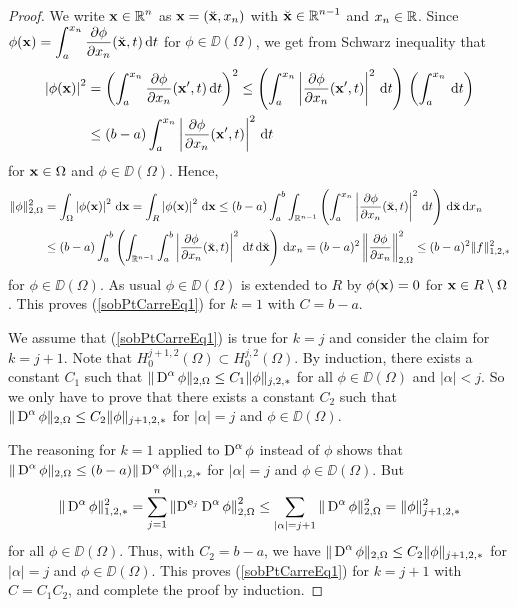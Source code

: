 \begin{proof}
We write $\displaystyle \mathbf{x}\in \mathbb{R}^n$ as
$\mathbf{x} = (\breve{\mathbf{x}}, x_n)$ with
$\displaystyle \breve{\mathbf{x}} \in \mathbb{R}^{n-1}$ and $x_n \in \mathbb{R}$.  Since
$\displaystyle \phi(\mathbf{x})
= \int_a^{x_n} \frac{\partial{\phi}}{\partial x_n}(\breve{\mathbf{x}}, t) \,\mathrm{d}{t}$
for $\phi \in \DD(\Omega)$, we get from Schwarz inequality that
\begin{align*}
\left|\phi(\mathbf{x})\right|^2 &= \left( \int_a^{x_n}
\frac{\partial{\phi}}{\partial x_n} (\mathbf{x}',t) \,\mathrm{d}{t} \right)^2 
\leq \left(\int_a^{x_n}
\left| \frac{\partial{\phi}}{\partial x_n} (\mathbf{x}',t)\right|^2 \,\mathrm{d}{t}\right)\,
\left( \int_a^{x_n} \,\mathrm{d}{t}\right) \\
&\leq (b-a) \int_a^{x_n} \left| \frac{\partial{\phi}}{\partial x_n} (\mathbf{x}',t)\right|^2 \,\mathrm{d}{t}
\end{align*}
for $\mathbf{x} \in \Omega$ and $\phi \in \DD(\Omega)$.  Hence,
\begin{align*}
\|\phi\|_{2,\Omega}^2 &= \int_\Omega \left|\phi(\mathbf{x})\right|^2\,\mathrm{d}{\mathbf{x}} 
= \int_R \left|\phi(\mathbf{x})\right|^2\,\mathrm{d}{\mathbf{x}}
\leq (b-a) \int_a^b \int_{\mathbb{R}^{n-1}} \left(
\int_a^{x_n} \left| \frac{\partial{\phi}}{\partial x_n} (\breve{\mathbf{x}},t)\right|^2 \,\mathrm{d}{t}\right)
\,\mathrm{d}{\breve{\mathbf{x}}} \,\mathrm{d}{x_n} \\
& \leq (b-a) \int_a^b \left( \int_{\mathbb{R}^{n-1}}
\int_a^b \left| \frac{\partial{\phi}}{\partial x_n} (\breve{\mathbf{x}},t)\right|^2 \,\mathrm{d}{t}
\,\mathrm{d}{\breve{\mathbf{x}}} \right) \,\mathrm{d}{x_n}
= (b-a)^2 \left\| \frac{\partial{\phi}}{\partial x_n} \right\|_{2,\Omega}^2 \leq (b-a)^2
\| f \|_{1,2,\ast}^2
\end{align*}
for $\phi \in \DD(\Omega)$.  As usual $\phi \in \DD(\Omega)$ is
extended to $R$ by $\phi(\mathbf{x}) = 0$ for $\mathbf{x} \in R \setminus \Omega$.
This proves (\ref{sobPtCarreEq1}) for $k=1$ with $C=b-a$.

We assume that (\ref{sobPtCarreEq1}) is true for $k=j$ and consider the claim
for $k=j+1$.  Note that
$\displaystyle H^{j+1,2}_0(\Omega) \subset H^{j,2}_0(\Omega)$.
By induction, there exists a constant $C_1$ such that
$\displaystyle \| \operatorname{D}^\alpha \phi \|_{2,\Omega}
\leq C_1 \|\phi\|_{j,2,\ast}$ for 
all $\phi \in \DD(\Omega)$ and $|\alpha| < j$.  So we only have to prove that
there exists a constant $C_2$ such that
$\displaystyle \| \operatorname{D}^\alpha \phi \|_{2,\Omega}
\leq C_2 \|\phi\|_{j+1,2,\ast}$ for
$|\alpha|=j$ and $\phi \in \DD(\Omega)$.

The reasoning for $k=1$ applied to $\displaystyle \operatorname{D}^\alpha \phi$
instead of $\phi$ shows
that $\displaystyle \|\operatorname{D}^\alpha \phi\|_{2,\Omega} \leq
(b-a) \| \operatorname{D}^\alpha \phi \|_{1,2,\ast}$
for $|\alpha|=j$ and $\phi \in \DD(\Omega)$.  But
\[
\| \operatorname{D}^\alpha \phi \|_{1,2,\ast}^2 = 
\sum_{j=1}^n \left\| \operatorname{D}^{\mathbf{e}_j} \operatorname{D}^\alpha \phi \right\|_{2,\Omega}^2 \leq
\sum_{|\alpha|=j+1} \| \operatorname{D}^\alpha \phi \|_{2,\Omega}^2 = \|\phi\|_{j+1,2,\ast}^2
\]
for all $\phi \in \DD(\Omega)$.  Thus, with $C_2=b-a$, we have
$\displaystyle \| \operatorname{D}^\alpha \phi \|_{2,\Omega}
\leq C_2 \|\phi\|_{j+1,2,\ast}$ for
$|\alpha|=j$ and $\phi \in \DD(\Omega)$.
This proves (\ref{sobPtCarreEq1}) for $k=j+1$ with $C=C_1 C_2$, and
complete the proof by induction.
\end{proof}

